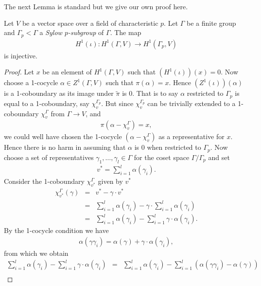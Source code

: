 The next Lemma is standard \cite[Theorem 10.3]{brown1976cohomology} but we give our own proof here.
\begin{lemma}
Let $V$ be a vector space over a field of characteristic $p$. Let $\Gamma$ be a finite group and $\Gamma_p < \Gamma$ a \emph{Sylow $p$-subgroup} of $\Gamma$. The map 
\begin{eqnarray*}
H^1(\iota):H^1(\Gamma, V)\rightarrow H^1(\Gamma_p, V)
\end{eqnarray*}
is injective.
\label{lem:a_h_restriction}
\end{lemma}
\begin{proof}
Let $x$ be an element of $H^1(\Gamma, V)$ such that $\left(H^1(\iota)\right)(x) = 0$. Now choose a 1-cocycle $\alpha \in Z^1(\Gamma, V)$ such that $\pi(\alpha) = x$. Hence $\left(Z^1(\iota)\right)(\alpha)$ is a 1-coboundary as its image under $\tilde\pi$ is 0. That is to say $\alpha$ restricted to $\Gamma_p$ is equal to a 1-coboundary, say $\chi_v^{\Gamma_p}$. But since $\chi_v^{\Gamma_p}$ can be trivially extended to a 1-coboundary $\chi_v^\Gamma$ from $\Gamma\rightarrow V$, and
\begin{eqnarray*}
	\pi(\alpha - \chi_v^\Gamma) = x,
\end{eqnarray*}
we could well have chosen the 1-cocycle $(\alpha - \chi_v^\Gamma)$ as a representative for $x$. Hence there is no harm in assuming that $\alpha$ is 0 when restricted to $\Gamma_p$.
Now choose a set of representatives $\gamma_1, \ldots, \gamma_l \in \Gamma$ for the coset space $\Gamma/\Gamma_p$ and set
\begin{eqnarray*}
	v^* = \sum_{i =1}^l \alpha(\gamma_i).
\end{eqnarray*}
Consider the 1-coboundary $\chi_{v^*}^\Gamma$ given by $v^*$
\begin{eqnarray*}
	\chi_{v^*}^\Gamma(\gamma) &=& v^* - \gamma\cdot v^* \\
	&=& \sum_{i = 1}^l\alpha(\gamma_i) - \gamma\cdot \sum_{i = 1}^l\alpha(\gamma_i) \\
	&=& \sum_{i = 1}^l\alpha(\gamma_i) - \sum_{i = 1}^l \gamma\cdot \alpha(\gamma_i).
\end{eqnarray*}
By the 1-cocycle condition we have
\begin{eqnarray*}
	\alpha(\gamma \gamma_i) = \alpha(\gamma) + \gamma\cdot\alpha(\gamma_i),
\end{eqnarray*}
from which we obtain
\begin{eqnarray*}
	 \sum_{i = 1}^l\alpha(\gamma_i) - \sum_{i = 1}^l \gamma\cdot \alpha(\gamma_i) 
	&=& \sum_{i = 1}^l\alpha(\gamma_i) - \sum_{i = 1}^l \left(\alpha(\gamma\gamma_i) - \alpha(\gamma) \right)\\

\end{eqnarray*}
\end{proof}
